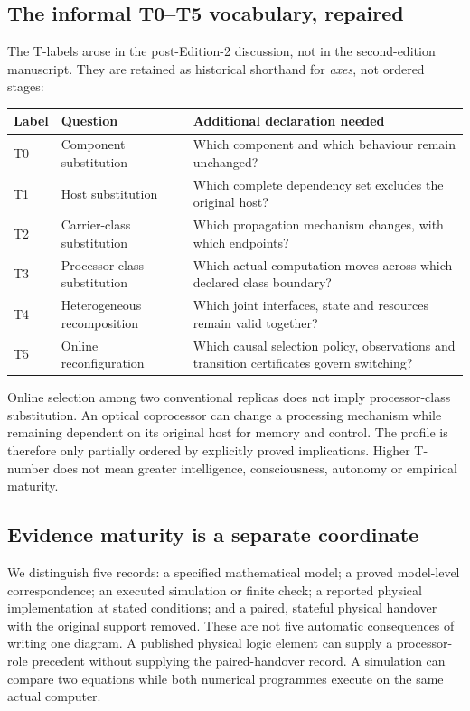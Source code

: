 \documentclass[11pt,a4paper]{article}
\theoremstyle{definition}
\theoremstyle{remark}
\begin{document}
\subsection{The informal T0--T5 vocabulary, repaired}
The T-labels arose in the post-Edition-2 discussion, not in the second-edition manuscript. They are retained as historical shorthand for \emph{axes}, not ordered stages:
\begin{center}\small
\begin{tabular}{@{}p{}p{}p{}@{}}\toprule
Label & Question & Additional declaration needed \\\midrule
T0 & Component substitution & Which component and which behaviour remain unchanged?\\
T1 & Host substitution & Which complete dependency set excludes the original host?\\
T2 & Carrier-class substitution & Which propagation mechanism changes, with which endpoints?\\
T3 & Processor-class substitution & Which actual computation moves across which declared class boundary?\\
T4 & Heterogeneous recomposition & Which joint interfaces, state and resources remain valid together?\\
T5 & Online reconfiguration & Which causal selection policy, observations and transition certificates govern switching?\\\bottomrule
\end{tabular}
\end{center}
Online selection among two conventional replicas does not imply processor-class substitution. An optical coprocessor can change a processing mechanism while remaining dependent on its original host for memory and control. The profile is therefore only partially ordered by explicitly proved implications. Higher T-number does not mean greater intelligence, consciousness, autonomy or empirical maturity.

\subsection{Evidence maturity is a separate coordinate}
We distinguish five records: a specified mathematical model; a proved model-level correspondence; an executed simulation or finite check; a reported physical implementation at stated conditions; and a paired, stateful physical handover with the original support removed. These are not five automatic consequences of writing one diagram. A published physical logic element can supply a processor-role precedent without supplying the paired-handover record. A simulation can compare two equations while both numerical programmes execute on the same actual computer.
\end{document}
